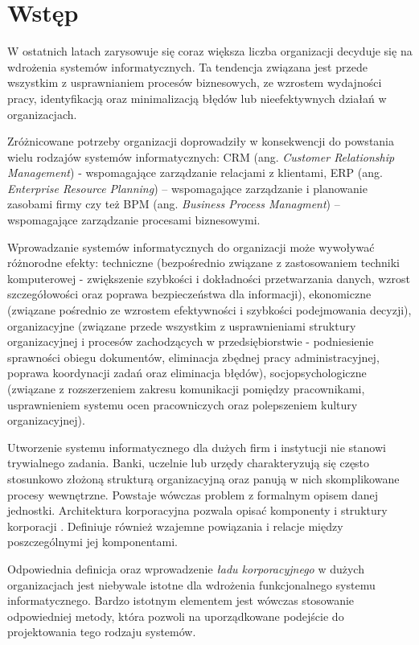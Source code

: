 \chapter{Wstęp}
W ostatnich latach zarysowuje się coraz większa liczba organizacji decyduje się na wdrożenia systemów informatycznych. Ta tendencja związana jest przede wszystkim z usprawnianiem procesów biznesowych, ze wzrostem wydajności pracy, identyfikacją oraz minimalizacją błędów lub nieefektywnych działań w organizacjach.

Zróżnicowane potrzeby organizacji doprowadziły w konsekwencji do powstania wielu rodzajów systemów informatycznych: CRM (ang. \emph{Customer Relationship Management}) - wspomagające zarządzanie relacjami z klientami, ERP (ang. \emph{Enterprise Resource Planning}) – wspomagające zarządzanie i planowanie zasobami firmy czy też BPM (ang. \emph{Business Process Managment}) – wspomagające zarządzanie procesami biznesowymi. 

Wprowadzanie systemów informatycznych do organizacji może wywoływać różnorodne efekty: techniczne (bezpośrednio związane z zastosowaniem techniki komputerowej - zwiększenie szybkości i dokładności przetwarzania danych, wzrost szczegółowości oraz poprawa bezpieczeństwa dla informacji), ekonomiczne (związane pośrednio ze wzrostem efektywności i szybkości podejmowania decyzji), organizacyjne (związane przede wszystkim z usprawnieniami struktury organizacyjnej i procesów zachodzących w przedsiębiorstwie - podniesienie sprawności obiegu dokumentów, eliminacja zbędnej pracy administracyjnej, poprawa koordynacji zadań oraz eliminacja błędów), socjopsychologiczne (związane z rozszerzeniem zakresu komunikacji pomiędzy pracownikami, usprawnieniem systemu ocen pracowniczych oraz polepszeniem kultury organizacyjnej). \cite{EfektyZasSys}

Utworzenie systemu informatycznego dla dużych firm i instytucji nie stanowi trywialnego zadania. Banki, uczelnie lub urzędy charakteryzują się często stosunkowo złożoną strukturą organizacyjną oraz panują w nich skomplikowane procesy wewnętrzne. Powstaje wówczas problem z formalnym opisem danej jednostki. Architektura korporacyjna pozwala opisać komponenty i struktury korporacji . Definiuje również wzajemne powiązania i relacje między poszczególnymi jej komponentami. 
 
Odpowiednia definicja oraz wprowadzenie \emph{ładu korporacyjnego} w dużych organizacjach jest niebywale istotne dla wdrożenia funkcjonalnego systemu informatycznego. Bardzo istotnym elementem jest wówczas stosowanie odpowiedniej metody, która pozwoli na uporządkowane podejście do projektowania tego rodzaju systemów. 


